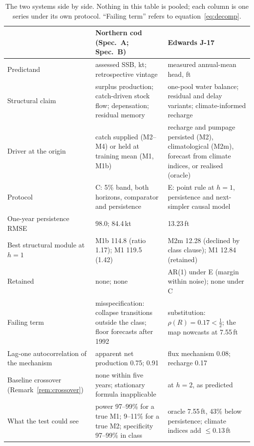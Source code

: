 \begin{table}[!htb]
\centering\small
\caption{The two systems side by side. Nothing in this table is pooled; each column is one series under its own protocol. ``Failing term'' refers to equation~\eqref{eq:decomp}.}
\label{tab:cross}
\begin{tabularx}{\textwidth}{@{}>{\raggedright\arraybackslash}p{}LL@{}}
\toprule
 & Northern cod (Spec.\ A; Spec.\ B) & Edwards J-17 \\
\midrule
Predictand & assessed SSB, kt; retrospective vintage & measured annual-mean head, ft \\
Structural claim & surplus production; catch-driven stock flow; depensation; residual memory & one-pool water balance; residual and delay variants; climate-informed recharge \\
Driver at the origin & catch supplied (M2--M4) or held at training mean (M1, M1b) & recharge and pumpage persisted (M2), climatological (M2m), forecast from climate indices, or realised (oracle) \\
Protocol & C: 5\% band, both horizons, comparator and persistence & E: point rule at $h=1$, persistence and next-simpler causal model \\
One-year persistence RMSE & 98.0; 84.4\,kt & 13.23\,ft \\
Best structural module at $h=1$ & M1b 114.8 (ratio 1.17); M1 119.5 (1.42) & M2m 12.28 (declined by class clause); M1 12.84 (retained) \\
Retained & none; none & AR(1) under E (margin within noise); none under C \\
Failing term & misspecification: collapse transitions outside the class; floor forecasts after 1992 & substitution: $\rho(R)=0.17<\tfrac12$; the map nowcasts at 7.55\,ft \\
Lag-one autocorrelation of the mechanism & apparent net production 0.75; 0.91 & flux mechanism 0.08; recharge 0.17 \\
Baseline crossover (Remark~\ref{rem:crossover}) & none within five years; stationary formula inapplicable & at $h=2$, as predicted \\
What the test could see & power 97--99\% for a true M1; 9--11\% for a true M2; specificity 97--99\% in class & oracle 7.55\,ft, 43\% below persistence; climate indices add $\le0.13$\,ft \\
\bottomrule
\end{tabularx}
\end{table}
